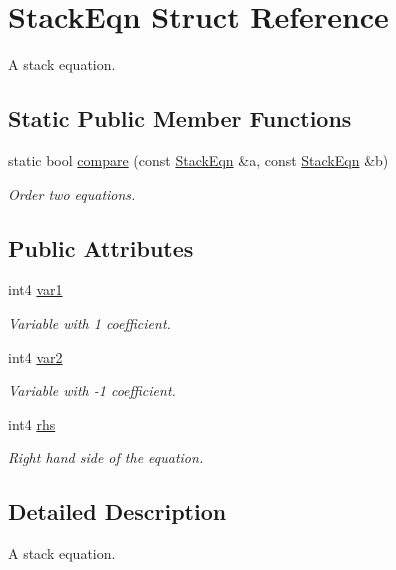 \hypertarget{struct_stack_eqn}{}\section{Stack\+Eqn Struct Reference}
\label{struct_stack_eqn}


A stack equation.  


\subsection*{Static Public Member Functions}
\begin{DoxyCompactItemize}
\item 
static bool \mbox{\hyperlink{struct_stack_eqn_ac0a43b31e135824bcbc459c48839c61b}{compare}} (const \mbox{\hyperlink{struct_stack_eqn}{Stack\+Eqn}} \&a, const \mbox{\hyperlink{struct_stack_eqn}{Stack\+Eqn}} \&b)
\begin{DoxyCompactList}\small\item\em Order two equations. \end{DoxyCompactList}\end{DoxyCompactItemize}
\subsection*{Public Attributes}
\begin{DoxyCompactItemize}
\item 
int4 \mbox{\hyperlink{struct_stack_eqn_a1253961b333617e44f2b5d564aac24cf}{var1}}
\begin{DoxyCompactList}\small\item\em Variable with 1 coefficient. \end{DoxyCompactList}\item 
int4 \mbox{\hyperlink{struct_stack_eqn_abc7b655e450f6f406111c4ca07366c37}{var2}}
\begin{DoxyCompactList}\small\item\em Variable with -\/1 coefficient. \end{DoxyCompactList}\item 
int4 \mbox{\hyperlink{struct_stack_eqn_a6077381330daeeed1ec22e242761d29a}{rhs}}
\begin{DoxyCompactList}\small\item\em Right hand side of the equation. \end{DoxyCompactList}\end{DoxyCompactItemize}


\subsection{Detailed Description}
A stack equation. 

